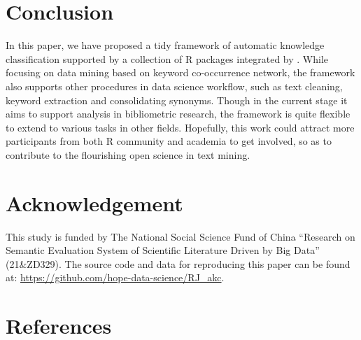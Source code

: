 \hypertarget{conclusion}{%
\section{Conclusion}\label{conclusion}}

In this paper, we have proposed a tidy framework of automatic knowledge classification supported by a collection of R packages integrated by . While focusing on data mining based on keyword co-occurrence network, the framework also supports other procedures in data science workflow, such as text cleaning, keyword extraction and consolidating synonyms. Though in the current stage it aims to support analysis in bibliometric research, the framework is quite flexible to extend to various tasks in other fields. Hopefully, this work could attract more participants from both R community and academia to get involved, so as to contribute to the flourishing open science in text mining.

\hypertarget{acknowledgement}{%
\section{Acknowledgement}\label{acknowledgement}}

This study is funded by The National Social Science Fund of China ``Research on Semantic Evaluation System of Scientific Literature Driven by Big Data'' (21\&ZD329). The source code and data for reproducing this paper can be found at: \url{https://github.com/hope-data-science/RJ_akc}.

\hypertarget{references}{%
\section*{References}\label{references}}

